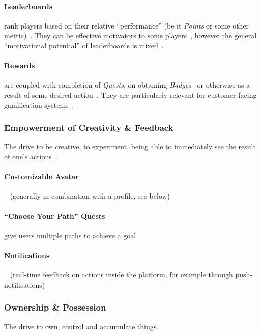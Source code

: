 \documentclass[runningheads]{llncs}
\begin{document}
\paragraph{Leaderboards} rank players based on their relative \enquote{performance} (be it \emph{Points} or some other metric)~\cite{ZichC11}. They can be effective motivators to some players~\cite{HaKS14}, however the general \enquote{motivational potential} of leaderboards is mixed~\cite{SaHMM17}.

\paragraph{Rewards} are coupled with completion of \emph{Quests}, on obtaining \emph{Badges}~\cite{Yongw15} or otherwise as a result of some desired action~\cite{XiZIA18}. They are particularly relevant for customer-facing gamification systems~\cite{XiZIA18}.

\subsubsection{Empowerment of Creativity \& Feedback\label{sec:creativity-and-feedback}} The drive to be creative, to experiment, being able to immediately see the result of one's actions~\cite{Chou15}.

\paragraph{Customizable Avatar}~\cite{SaHMM17} (generally in combination with a profile, see below)

\paragraph{\enquote{Choose Your Path} Quests} give users multiple paths to achieve a goal

\paragraph{Notifications}~\cite{SaHMM17} (real-time feedback on actions inside the platform, for example through push-notifications)

\subsubsection{Ownership \& Possession\label{sec:ownership-and-possession}}\cite{Chou15} The drive to own, control and accumulate things.
\end{document}
